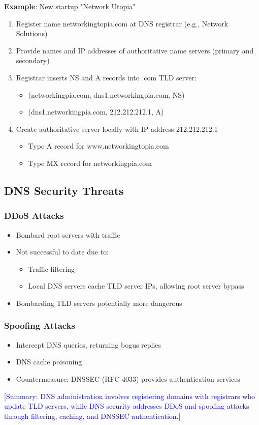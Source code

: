 \documentclass[12pt]{article}
\begin{document}
\textbf{Example}: New startup "Network Utopia"

\begin{enumerate}
    \item Register name networkingtopia.com at DNS registrar (e.g., Network Solutions)
    \item Provide names and IP addresses of authoritative name servers (primary and secondary)
    \item Registrar inserts NS and A records into .com TLD server:
          \begin{itemize}
              \item (networkingpia.com, dns1.networkingpia.com, NS)
              \item (dns1.networkingpia.com, 212.212.212.1, A)
          \end{itemize}
    \item Create authoritative server locally with IP address 212.212.212.1
          \begin{itemize}
              \item Type A record for www.networkingtopia.com
              \item Type MX record for networkingpia.com
          \end{itemize}
\end{enumerate}

\subsection{DNS Security Threats}
\subsubsection{DDoS Attacks}
\begin{itemize}
    \item Bombard root servers with traffic
    \item Not successful to date due to:
          \begin{itemize}
              \item Traffic filtering
              \item Local DNS servers cache TLD server IPs, allowing root server bypass
          \end{itemize}
    \item Bombarding TLD servers potentially more dangerous
\end{itemize}

\subsubsection{Spoofing Attacks}
\begin{itemize}
    \item Intercept DNS queries, returning bogus replies
    \item DNS cache poisoning
    \item Countermeasure: DNSSEC (RFC 4033) provides authentication services
\end{itemize}

\textcolor{blue}{[Summary: DNS administration involves registering domains with registrars who update TLD servers, while DNS security addresses DDoS and spoofing attacks through filtering, caching, and DNSSEC authentication.]}
\end{document}
